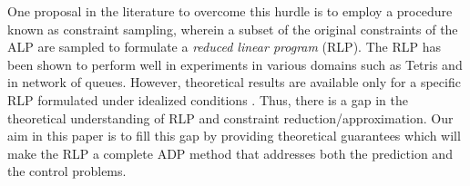 One proposal in the literature to overcome this hurdle is 
	to employ a procedure known as constraint sampling, 
	wherein a subset of the original constraints of the ALP 
	are sampled to formulate a \emph{reduced linear program} (RLP). 
The RLP has been shown to perform well in experiments \cite{ALP,CS,CST} 
	in various domains such as Tetris and in network of queues. 
However, theoretical results are available only for a specific RLP 
	formulated under idealized conditions \cite{CS}. 
Thus, there is a gap in the theoretical understanding of RLP 
	and constraint reduction/approximation. 
Our aim in this paper is to fill this gap by providing theoretical guarantees 
	which will make the RLP a complete ADP method that addresses 
	both the prediction and the control problems. 

